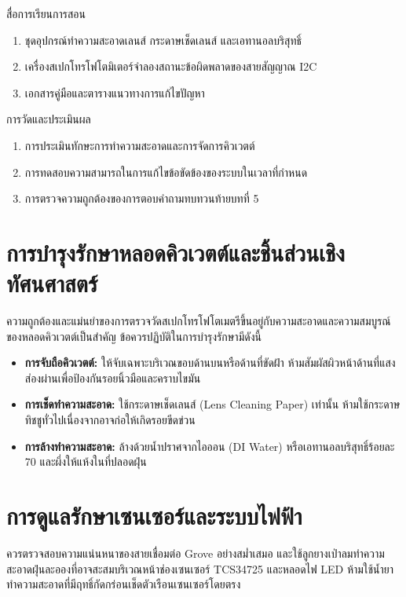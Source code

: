\begin{planbox}{สื่อการเรียนการสอน}
\begin{enumerate}[leftmargin=1.5em, itemsep=1pt]
    \item ชุดอุปกรณ์ทำความสะอาดเลนส์ กระดาษเช็ดเลนส์ และเอทานอลบริสุทธิ์
    \item เครื่องสเปกโทรโฟโตมิเตอร์จำลองสถานะข้อผิดพลาดของสายสัญญาณ I2C
    \item เอกสารคู่มือและตารางแนวทางการแก้ไขปัญหา
\end{enumerate}
\end{planbox}

\begin{planbox}{การวัดและประเมินผล}
\begin{enumerate}[leftmargin=1.5em, itemsep=1pt]
    \item การประเมินทักษะการทำความสะอาดและการจัดการคิวเวตต์
    \item การทดสอบความสามารถในการแก้ไขข้อขัดข้องของระบบในเวลาที่กำหนด
    \item การตรวจความถูกต้องของการตอบคำถามทบทวนท้ายบทที่ 5
\end{enumerate}
\end{planbox}

\clearpage

\section{การบำรุงรักษาหลอดคิวเวตต์และชิ้นส่วนเชิงทัศนศาสตร์}
ความถูกต้องและแม่นยำของการตรวจวัดสเปกโทรโฟโตเมตรีขึ้นอยู่กับความสะอาดและความสมบูรณ์ของหลอดคิวเวตต์เป็นสำคัญ ข้อควรปฏิบัติในการบำรุงรักษามีดังนี้
\begin{itemize}[leftmargin=1.5em, itemsep=2pt]
    \item \textbf{การจับถือคิวเวตต์:} ให้จับเฉพาะบริเวณขอบด้านบนหรือด้านที่ขัดฝ้า ห้ามสัมผัสผิวหน้าด้านที่แสงส่องผ่านเพื่อป้องกันรอยนิ้วมือและคราบไขมัน
    \item \textbf{การเช็ดทำความสะอาด:} ใช้กระดาษเช็ดเลนส์ (Lens Cleaning Paper) เท่านั้น ห้ามใช้กระดาษทิชชูทั่วไปเนื่องจากอาจก่อให้เกิดรอยขีดข่วน
    \item \textbf{การล้างทำความสะอาด:} ล้างด้วยน้ำปราศจากไอออน (DI Water) หรือเอทานอลบริสุทธิ์ร้อยละ 70 และผึ่งให้แห้งในที่ปลอดฝุ่น
\end{itemize}

\section{การดูแลรักษาเซนเซอร์และระบบไฟฟ้า}
ควรตรวจสอบความแน่นหนาของสายเชื่อมต่อ Grove อย่างสม่ำเสมอ และใช้ลูกยางเป่าลมทำความสะอาดฝุ่นละอองที่อาจสะสมบริเวณหน้าช่องเซนเซอร์ TCS34725 และหลอดไฟ LED ห้ามใช้น้ำยาทำความสะอาดที่มีฤทธิ์กัดกร่อนเช็ดตัวเรือนเซนเซอร์โดยตรง

